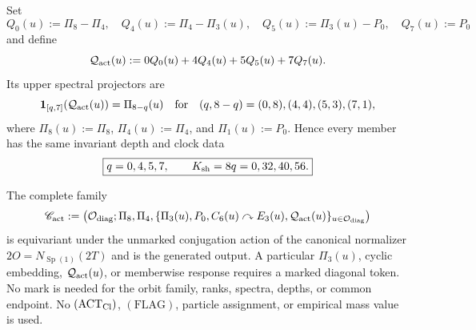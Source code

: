 \documentclass[12pt,a4paper]{article}
\begin{document}
\begin{theorem}
Set
\[
 Q_0(u):=\Pi_8-\Pi_4,\quad
 Q_4(u):=\Pi_4-\Pi_3(u),\quad
 Q_5(u):=\Pi_3(u)-P_0,\quad
 Q_7(u):=P_0
\]
and define
\begin{equation}
\label{p3:eq:active-depth-operator}
 \mathcal Q_{\rm act}(u)
 :=0Q_0(u)+4Q_4(u)+5Q_5(u)+7Q_7(u).
\end{equation}
Its upper spectral projectors are
\begin{equation}
\label{p3:eq:active-upper-spectral-projectors}
 \mathbf1_{[q,7]}(\mathcal Q_{\rm act}(u))
 =\Pi_{8-q}(u)
 \quad\text{for}\quad
 (q,8-q)=(0,8),(4,4),(5,3),(7,1),
\end{equation}
where \(\Pi_8(u):=\Pi_8\), \(\Pi_4(u):=\Pi_4\), and
\(\Pi_1(u):=P_0\).  Hence every member has the same invariant depth and clock
data
\begin{equation}
\label{p3:eq:derived-active-depth-clock}
 \boxed{q=0,4,5,7,
 \qquad K_{\rm sh}=8q=0,32,40,56.}
\end{equation}

The complete family
\[
  \mathscr C_{\rm act}
 :=\left(
 \mathcal O_{\rm diag};
 \Pi_8,\Pi_4,
 \{\Pi_3(u),P_0,C_6(u)\curvearrowright E_3(u),
   \mathcal Q_{\rm act}(u)\}_{u\in\mathcal O_{\rm diag}}
 \right)
\]
is equivariant under the unmarked conjugation action of the canonical
normalizer \(2O=N_{\operatorname{Sp}(1)}(2T)\) and is the
generated output.  A particular \(\Pi_3(u)\), cyclic embedding,
\(\mathcal Q_{\rm act}(u)\), or memberwise response requires a marked
diagonal token.  No mark is needed for the orbit family, ranks, spectra,
depths, or common endpoint.  No \((\mathrm{ACT}_{\rm Cl})\),
\((\mathrm{FLAG})\), particle assignment, or empirical mass value is used.
\end{theorem}
\end{document}
